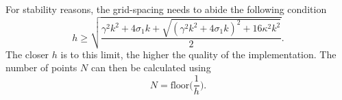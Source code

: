 \documentclass{article}
\begin{document}
For stability reasons, the grid-spacing needs to abide the following condition \cite{Bilbao2009:NumericalSoundSynthesis}
\begin{equation}\label{eq:stabilityString}
    h \geq \sqrt{\frac{\gamma^2 k^2 + 4 \sigma_1 k + \sqrt {(\gamma^2 k^2 + 4 \sigma_1 k)^2 + 16 \kappa^2 k^2}}{2}}.
\end{equation}
The closer $h$ is to this limit, the higher the quality of the implementation. The number of points $N$ can then be calculated using 
\begin{equation}
    N = \text{floor}\bigg(\frac{1}{h}\bigg).
\end{equation}

\end{document}
